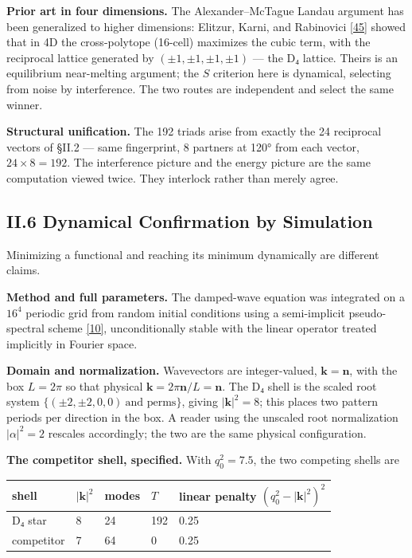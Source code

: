 \documentclass[a4paper,11pt]{article}
\begin{document}
\textbf{Prior art in four dimensions.} The Alexander–McTague Landau argument has been generalized to higher dimensions: Elitzur, Karni, and Rabinovici \hyperref[ref45]{[45]} showed that in 4D the cross-polytope (16-cell) maximizes the cubic term, with the reciprocal lattice generated by $(\pm1,\pm1,\pm1,\pm1)$ — the D₄ lattice. Theirs is an equilibrium near-melting argument; the $S$ criterion here is dynamical, selecting from noise by interference. The two routes are independent and select the same winner.

\textbf{Structural unification.} The 192 triads arise from exactly the 24 reciprocal vectors of §II.2 — same fingerprint, 8 partners at 120° from each vector, $24\times8=192$. The interference picture and the energy picture are the same computation viewed twice. They interlock rather than merely agree.

\subsection*{II.6 Dynamical Confirmation by Simulation}

Minimizing a functional and reaching its minimum dynamically are different claims.

\textbf{Method and full parameters.} The damped-wave equation was integrated on a $16^4$ periodic grid from random initial conditions using a semi-implicit pseudo-spectral scheme \hyperref[ref10]{[10]}, unconditionally stable with the linear operator treated implicitly in Fourier space.

\textbf{Domain and normalization.} Wavevectors are integer-valued, $\mathbf{k}=\mathbf{n}$, with the box $L=2\pi$ so that physical $\mathbf{k}=2\pi\mathbf{n}/L=\mathbf{n}$. The D₄ shell is the scaled root system $\{(\pm2,\pm2,0,0)\ \text{and perms}\}$, giving $|\mathbf{k}|^2=8$; this places two pattern periods per direction in the box. A reader using the unscaled root normalization $|\alpha|^2=2$ rescales accordingly; the two are the same physical configuration.

\textbf{The competitor shell, specified.} With $q_0^2=7.5$, the two competing shells are

\begin{center}
\begin{tabular}{lllll}
\hline
shell & $|\mathbf{k}|^2$ & modes & $T$ & linear penalty $(q_0^2-|\mathbf{k}|^2)^2$ \\
\hline
D₄ star & 8 & 24 & 192 & 0.25 \\
competitor & 7 & 64 & 0 & 0.25 \\
\hline
\end{tabular}
\end{center}
\end{document}
